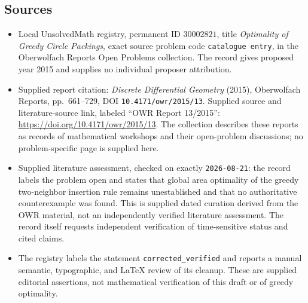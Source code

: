\documentclass[11pt]{article}
\begin{document}
\subsection{Sources}
\begin{itemize}
\item Local UnsolvedMath registry, permanent ID \(30002821\), title \emph{Optimality of Greedy Circle Packings}, exact source problem code \texttt{catalogue entry}, in the Oberwolfach Reports Open Problems collection. The record gives proposed year 2015 and supplies no individual proposer attribution.
\item Supplied report citation: \emph{Discrete Differential Geometry} (2015), Oberwolfach Reports, pp.\ 661--729, DOI \texttt{10.4171/owr/2015/13}. Supplied source and literature-source link, labeled ``OWR Report 13/2015'': \url{https://doi.org/10.4171/owr/2015/13}. The collection describes these reports as records of mathematical workshops and their open-problem discussions; no problem-specific page is supplied here.
\item Supplied literature assessment, checked on exactly \texttt{2026-08-21}: the record labels the problem open and states that global area optimality of the greedy two-neighbor insertion rule remains unestablished and that no authoritative counterexample was found. This is supplied dated curation derived from the OWR material, not an independently verified literature assessment. The record itself requests independent verification of time-sensitive status and cited claims.
\item The registry labels the statement \texttt{corrected\_verified} and reports a manual semantic, typographic, and LaTeX review of its cleanup. These are supplied editorial assertions, not mathematical verification of this draft or of greedy optimality.
\end{itemize}
\end{document}
